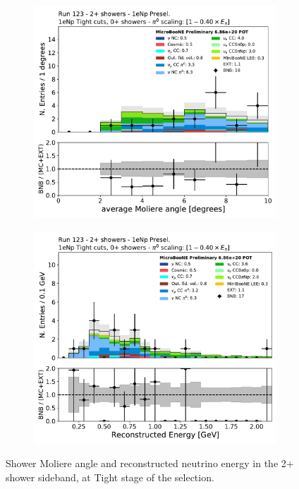 \begin{figure}[H]
    \begin{center}
    \begin{subfigure}{0.4\textwidth}
    \includegraphics[width=1.00\textwidth]{Sidebands/Figures/1eNp/TwoShower/TwoPShr_NP_NPTAllShr_pi0e040/shrmoliereavg_zoomed.pdf}
    \end{subfigure}
    \begin{subfigure}{0.4\textwidth}
    \includegraphics[width=1.00\textwidth]{Sidebands/Figures/1eNp/TwoShower/TwoPShr_NP_NPTAllShr_pi0e040/reco_e.pdf}
    \end{subfigure}
    \caption{\label{fig:sb:1eNp:twopshr:tight} Shower Moliere angle and reconstructed neutrino energy in the 2+ shower sideband, at Tight stage of the \npsel selection.}
    \end{center}
\end{figure}

